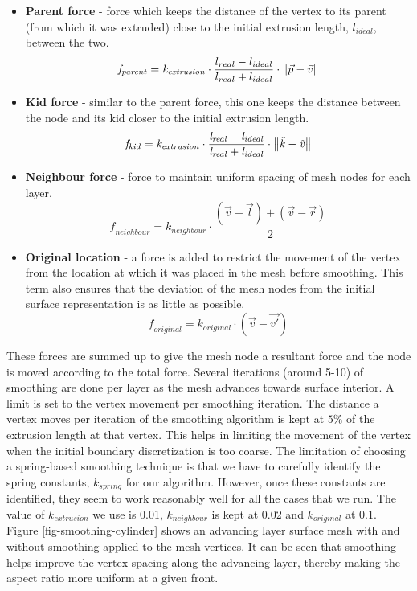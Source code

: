 \begin{itemize}
\item \textbf{Parent force} - force which keeps the distance of the vertex to its parent (from which it was extruded) close to the initial extrusion length, $\mathit{l_{ideal}}$, between the two.
\begin{equation}
\mathit{f_{parent}} = \mathit{k_{extrusion}} \cdot \frac{l_{real} - l_{ideal}}{l_{real} + l_{ideal}} \cdot \left\lVert \vec{p} - \vec{v}\right\rVert
\end{equation}
\item \textbf{Kid force} - similar to the parent force, this one keeps the distance between the node and its kid closer to the initial extrusion length.
\begin{equation}
\mathit{f_{kid} = k_{extrusion} \cdot \frac{l_{real} - l_{ideal}}{l_{real} + l_{ideal}} \cdot \left\lVert\vec{k} - \vec{v}\right\rVert}
\end{equation}
\item \textbf{Neighbour force} - force to maintain uniform spacing of mesh nodes for each layer.
\begin{equation}
\mathit{f_{neighbour} = k_{neighbour} \cdot \frac{(\vec{v} - \vec{l}) + (\vec{v}- \vec{r})}{ 2}}
\end{equation}
\item \textbf{Original location} - a force is added to restrict the movement of the vertex from the location at which it was placed in the mesh before smoothing. This term also ensures that the deviation of the mesh nodes from the initial surface representation is as little as possible.
\begin{equation}
\mathit{f_{original} = k_{original} \cdot (\vec{v}- \vec{v'})}
\end{equation}
\end{itemize}

These forces are summed up to give the mesh node a resultant force and the node is moved according to the total force. Several iterations (around 5-10) of smoothing are done per layer as the mesh advances towards surface interior. A limit is set to the vertex movement per smoothing iteration. The distance a vertex moves per iteration of the smoothing algorithm is kept at $5\%$ of the extrusion length at that vertex. This helps in limiting the movement of the vertex when the initial boundary discretization is too coarse. The limitation of choosing a spring-based smoothing technique is that we have to carefully identify the spring constants, $\mathit{k_{spring}}$ for our algorithm. However, once these constants are identified, they seem to work reasonably well for all the cases that we run. The value of $\mathit{k_{extrusion}}$ we use is 0.01, $k_{neighbour}$ is kept at 0.02 and $\mathit{k_{original}}$ at 0.1. Figure \ref{fig-smoothing-cylinder} shows an advancing layer surface mesh with and without smoothing applied to the mesh vertices. It can be seen that smoothing helps improve the vertex spacing along the advancing layer, thereby making the aspect ratio more uniform at a given front.


